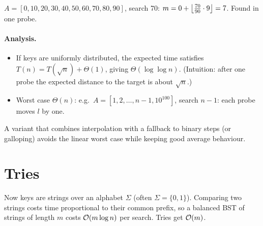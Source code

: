 \begin{center}
\end{center}

\begin{example}
$A = [0, 10, 20, 30, 40, 50, 60, 70, 80, 90]$, search 70:
$m = 0 + \left\lfloor \frac{70}{90}\cdot 9 \right\rfloor = 7$. Found in one probe.
\end{example}

\paragraph{Analysis.}
\begin{itemize}
  \item If keys are uniformly distributed, the expected time satisfies
        $T(n) = T(\sqrt n) + \Theta(1)$, giving $\Theta(\log \log n)$. (Intuition:
        after one probe the expected distance to the target is about $\sqrt n$.)
  \item Worst case $\Theta(n)$: e.g.\ $A = [1, 2, \ldots, n-1, 10^{100}]$, search
        $n - 1$: each probe moves $l$ by one.
\end{itemize}

\begin{aside}
A variant that combines interpolation with a fallback to binary steps (or
galloping) avoids the linear worst case while keeping good average behaviour.
\end{aside}

\section{Tries}

Now keys are strings over an alphabet $\Sigma$ (often $\Sigma = \{0,1\}$). Comparing
two strings costs time proportional to their common prefix, so a balanced BST of
strings of length $m$ costs $\mathcal{O}(m\log n)$ per search. Tries get $\mathcal{O}(m)$.

